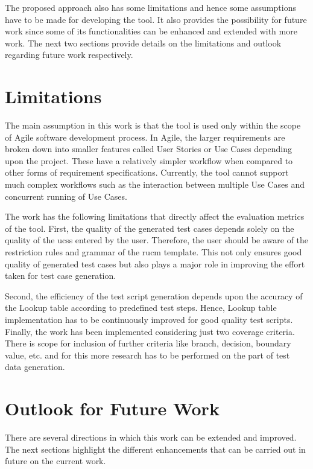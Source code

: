 The proposed approach also has some limitations and hence some assumptions have to be made for developing the tool. It also provides the possibility for future work since some of its functionalities can be enhanced and extended with more work. The next two sections provide details on the limitations and outlook regarding future work respectively.

 
\section{Limitations}
The main assumption in this work is that the tool is used only within the scope of Agile software development process. In Agile, the larger requirements are broken down into smaller features called User Stories or Use Cases depending upon the project. These have a relatively simpler workflow when compared to other forms of requirement specifications. Currently, the tool cannot support much complex workflows such as the interaction between multiple Use Cases and concurrent running of Use Cases.

The work has the following limitations that directly affect the evaluation metrics of the tool. First, the quality of the generated test cases depends solely on the quality of the \glspl{ucs} entered by the user. Therefore, the user should be aware of the restriction rules and grammar of the \gls{rucm} template. This not only ensures good quality of generated test cases but also plays a major role in improving the effort taken for test case generation.  

Second, the efficiency of the test script generation depends upon the accuracy of the Lookup table according to predefined test steps. Hence, Lookup table implementation has to be continuously improved for good quality test scripts. Finally, the work has been implemented considering just two coverage criteria. There is scope for inclusion of further criteria like branch, decision, boundary value, etc. and for this more research has to be performed on the part of test data generation.


\section{Outlook for Future Work}
There are several directions in which this work can be extended and improved. The next sections highlight the different enhancements that can be carried out in future on the current work.

